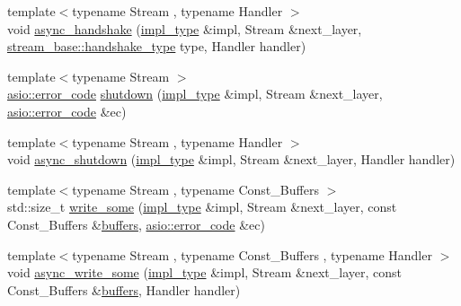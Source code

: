 \begin{DoxyCompactItemize}
\item 
{\footnotesize template$<$typename Stream , typename Handler $>$ }\\void \hyperlink{classasio_1_1ssl_1_1old_1_1detail_1_1openssl__stream__service_a3125cc31ac8e52edc2dea9c666b1b9a3}{async\+\_\+handshake} (\hyperlink{classasio_1_1ssl_1_1old_1_1detail_1_1openssl__stream__service_a2419fd5a889197ed63b6d0bd14656027}{impl\+\_\+type} \&impl, Stream \&next\+\_\+layer, \hyperlink{classasio_1_1ssl_1_1stream__base_a2f18813d3860bc8aee99249834d7c320}{stream\+\_\+base\+::handshake\+\_\+type} type, Handler handler)
\item 
{\footnotesize template$<$typename Stream $>$ }\\\hyperlink{classasio_1_1error__code}{asio\+::error\+\_\+code} \hyperlink{classasio_1_1ssl_1_1old_1_1detail_1_1openssl__stream__service_a32b29e1b32b004f56e8cfcc8400b4fe8}{shutdown} (\hyperlink{classasio_1_1ssl_1_1old_1_1detail_1_1openssl__stream__service_a2419fd5a889197ed63b6d0bd14656027}{impl\+\_\+type} \&impl, Stream \&next\+\_\+layer, \hyperlink{classasio_1_1error__code}{asio\+::error\+\_\+code} \&ec)
\item 
{\footnotesize template$<$typename Stream , typename Handler $>$ }\\void \hyperlink{classasio_1_1ssl_1_1old_1_1detail_1_1openssl__stream__service_ae717e4928c2069111c5fe684b883fb1a}{async\+\_\+shutdown} (\hyperlink{classasio_1_1ssl_1_1old_1_1detail_1_1openssl__stream__service_a2419fd5a889197ed63b6d0bd14656027}{impl\+\_\+type} \&impl, Stream \&next\+\_\+layer, Handler handler)
\item 
{\footnotesize template$<$typename Stream , typename Const\+\_\+\+Buffers $>$ }\\std\+::size\+\_\+t \hyperlink{classasio_1_1ssl_1_1old_1_1detail_1_1openssl__stream__service_aad68acc69e58a8935548b7332c0683d6}{write\+\_\+some} (\hyperlink{classasio_1_1ssl_1_1old_1_1detail_1_1openssl__stream__service_a2419fd5a889197ed63b6d0bd14656027}{impl\+\_\+type} \&impl, Stream \&next\+\_\+layer, const Const\+\_\+\+Buffers \&\hyperlink{group__async__read_ga54dede45c3175148a77fe6635222c47d}{buffers}, \hyperlink{classasio_1_1error__code}{asio\+::error\+\_\+code} \&ec)
\item 
{\footnotesize template$<$typename Stream , typename Const\+\_\+\+Buffers , typename Handler $>$ }\\void \hyperlink{classasio_1_1ssl_1_1old_1_1detail_1_1openssl__stream__service_adc4e989ac48bd495dec519b946004f33}{async\+\_\+write\+\_\+some} (\hyperlink{classasio_1_1ssl_1_1old_1_1detail_1_1openssl__stream__service_a2419fd5a889197ed63b6d0bd14656027}{impl\+\_\+type} \&impl, Stream \&next\+\_\+layer, const Const\+\_\+\+Buffers \&\hyperlink{group__async__read_ga54dede45c3175148a77fe6635222c47d}{buffers}, Handler handler)

\end{DoxyCompactItemize}
